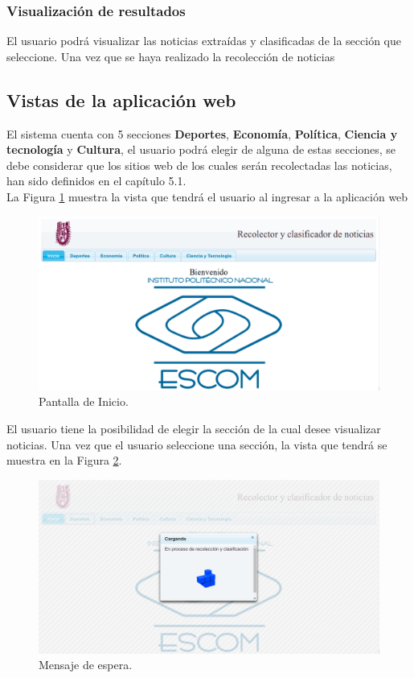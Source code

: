 \subsubsection{Visualización de resultados}
El usuario podrá visualizar las noticias extraídas y clasificadas de la sección que seleccione.
Una vez que se haya realizado la recolección de noticias

\subsection{Vistas de la aplicación web}

El sistema cuenta con 5 secciones \textbf{Deportes}, \textbf{Economía}, \textbf{Política}, \textbf{Ciencia y tecnología} y \textbf{Cultura}, el usuario podrá elegir de alguna de estas secciones, se debe considerar que los sitios web de los cuales serán recolectadas las noticias, han sido definidos en el capítulo 5.1.\\
La Figura \ref{fig:PantallaInicio} muestra la vista que tendrá el usuario al ingresar a la aplicación web
\\
\begin{figure}[H]
\centering
\includegraphics[scale=0.29]{imagenes/Capitulo5/pantallaPrincipal.png}
\caption{Pantalla de Inicio.}
\label{fig:PantallaInicio}
\end{figure}

El usuario tiene la posibilidad de elegir la sección de la cual desee visualizar noticias. Una vez que el usuario seleccione una sección, la vista que tendrá se muestra en la Figura \ref{fig:loading}.
\\
\begin{figure}[H]
\centering
\includegraphics[scale=0.29]{imagenes/Capitulo5/mensajeEspera.png}
\caption{Mensaje de espera.}
\label{fig:loading}
\end{figure}

